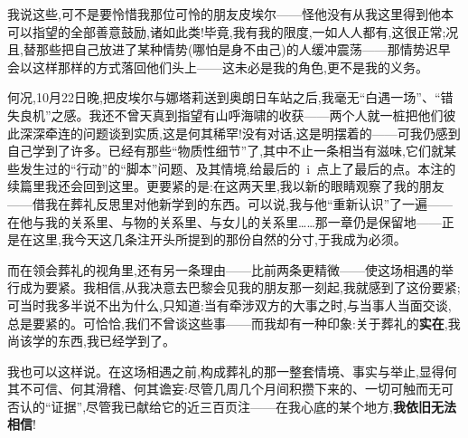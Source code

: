 我说这些,可不是要怜惜我那位可怜的朋友皮埃尔——怪他没有从我这里得到他本可以指望的全部善意鼓励,诸如此类!毕竟,我有我的限度,一如人人都有,这很正常;况且,替那些把自己放进了某种情势(哪怕是身不由己)的人缓冲震荡——那情势迟早会以这样那样的方式落回他们头上——这未必是我的角色,更不是我的义务。

\dmark{}何况,10月22日晚,把皮埃尔与娜塔莉送到奥朗日车站之后,我毫无“白遇一场”、“错失良机”之感。我还不曾天真到指望有山呼海啸的收获——两个人就一桩把他们彼此深深牵连的问题谈到实质,这是何其稀罕!没有对话,这是明摆着的——可我仍感到自己学到了许多。已经有那些“物质性细节”了,其中不止一条相当有滋味,它们就某些发生过的“行动”的“脚本”问题、及其情境,给最后的~i~点上了最后的点。本注的续篇里我还会回到这里。更要紧的是:在这两天里,我以新的眼睛观察了我的朋友——借我在葬礼反思里对他新学到的东西。可以说,我与他“重新认识”了一遍——在他与我的关系里、与物的关系里、与女儿的关系里……那一章仍是保留地——正是在这里,我今天这几条注开头所提到的那份自然的分寸,于我成为必须。

而在领会葬礼的视角里,还有另一条理由——比前两条更精微——使这场相遇的举行成为要紧。我相信,从我决意去巴黎会见我的朋友那一刻起,我就感到了这份要紧;可当时我多半说不出为什么,只知道:当有牵涉双方的大事之时,与当事人当面交谈,总是要紧的。可恰恰,我们不曾谈这些事——而我却有一种印象:关于葬礼的\textbf{实在},我尚该学的东西,我已经学到了。

我也可以这样说。在这场相遇之前,构成葬礼的那一整套情境、事实与举止,显得何其不可信、何其滑稽、何其谵妄:尽管几周几个月间积攒下来的、一切可触而无可否认的“证据”,尽管我已献给它的近三百页注——在我心底的某个地方,\textbf{我依旧无法相信}!

